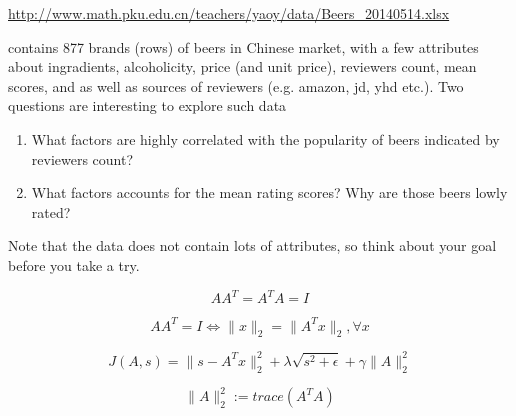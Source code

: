\documentclass[11pt]{article}
\begin{document}
\url{http://www.math.pku.edu.cn/teachers/yaoy/data/Beers_20140514.xlsx}

\noindent contains 877 brands (rows) of beers in Chinese market, with a few attributes about ingradients, alcoholicity, price (and unit price), reviewers count, mean scores, and as well as sources of reviewers (e.g. amazon, jd, yhd etc.). Two questions are interesting to explore such data

\begin{enumerate}
\item What factors are highly correlated with the popularity of beers indicated by reviewers count?
\item What factors accounts for the mean rating scores? Why are those beers lowly rated?
\end{enumerate}

Note that the data does not contain lots of attributes, so think about your goal before you take a try.


$$ A A^T = A^T A = I $$

$$ AA^T = I \Leftrightarrow \|x\|_2 = \|A^Tx\|_2, \forall x$$

\[ J(A,s) = \|s - A^T x\|_2^2 + \lambda \sqrt{s^2+\epsilon} + \gamma \|A\|_2^2\]

\[ \|A\|_2^2 := trace(A^T A)\]
\end{document}
